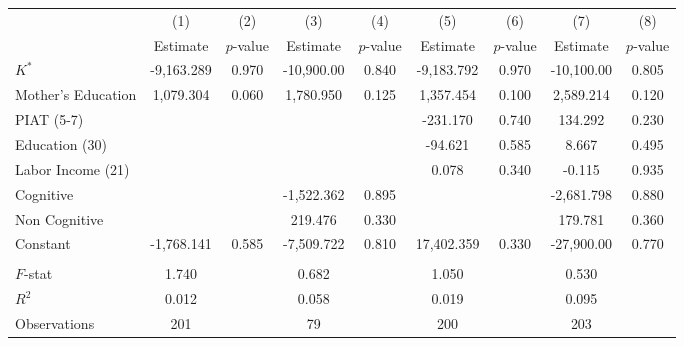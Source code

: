 \begin{tabular}{lcccccccc} \toprule
 & (1) & (2) & (3) & (4) & (5) & (6) & (7) & (8) \\
 & Estimate  & $p$-value  & Estimate  & $p$-value  & Estimate  & $p$-value  & Estimate  & $p$-value  \\  \midrule
$K^\ast$ & -9,163.289 &     0.970 & -10,900.00 &     0.840 & -9,183.792 &     0.970 & -10,100.00 &     0.805 \\
Mother's Education &  1,079.304 &     0.060 &  1,780.950 &     0.125 &  1,357.454 &     0.100 &  2,589.214 &     0.120 \\
PIAT (5-7) &         &         &         &         &  -231.170 &     0.740 &   134.292 &     0.230 \\
Education (30) &         &         &         &         &   -94.621 &     0.585 &     8.667 &     0.495 \\
Labor Income (21) &         &         &         &         &     0.078 &     0.340 &    -0.115 &     0.935 \\
Cognitive &         &         & -1,522.362 &     0.895 &         &         & -2,681.798 &     0.880 \\
Non Cognitive &         &         &   219.476 &     0.330 &         &         &   179.781 &     0.360 \\
Constant & -1,768.141 &     0.585 & -7,509.722 &     0.810 & 17,402.359 &     0.330 & -27,900.00 &     0.770 \\  \\ \midrule
$F$-stat &     1.740 &         &     0.682 &         &     1.050 &         &     0.530 &        \\
$R^2$ &     0.012 &         &     0.058 &         &     0.019 &         &     0.095 &        \\
Observations &   201 &         &    79 &         &   200 &         &   203  &        \\
\bottomrule  \end{tabular}
